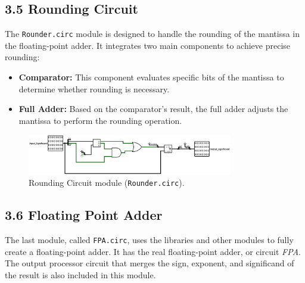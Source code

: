 \documentclass{article}
\begin{document}
\subsection*{3.5 Rounding Circuit}
The \texttt{Rounder.circ} module is designed to handle the rounding of the mantissa in the floating-point adder. It integrates two main components to achieve precise rounding:

\begin{itemize}
    \item \textbf{Comparator:} This component evaluates specific bits of the mantissa to determine whether rounding is necessary.
    \item \textbf{Full Adder:} Based on the comparator's result, the full adder adjusts the mantissa to perform the rounding operation.
\end{itemize}


\begin{figure}[h!]
\centering
\includegraphics[width=0.8\textwidth]{Rounding.jpg} %
\caption{Rounding Circuit module (\texttt{Rounder.circ}).}
\label{fig:rounding_circuit}
\end{figure}
\pagebreak



\subsection*{3.6 Floating Point Adder}

The last module, called \texttt{FPA.circ}, uses the libraries and other modules to fully create a floating-point adder. It has the real floating-point adder, or circuit \textit{FPA}. The output processor circuit that merges the sign, exponent, and significand of the result is also included in this module.
\end{document}
